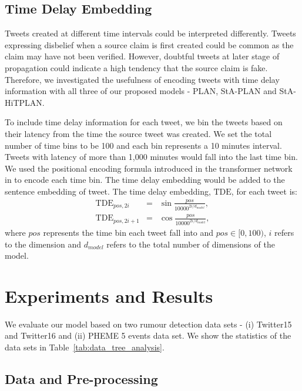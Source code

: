\documentclass[letterpaper]{article} %
\begin{document}
\subsection{Time Delay Embedding}
\label{sec:timedelay}
Tweets created at different time intervals could be interpreted differently. Tweets expressing disbelief when a source claim is first created could be common as the claim may have not been verified. However, doubtful tweets at later stage of propagation could indicate a high tendency that the source claim is fake. Therefore, we investigated the usefulness of encoding tweets with time delay information with all three of our proposed models - PLAN, StA-PLAN and StA-HiTPLAN.

To include time delay information for each tweet, we bin the tweets based on their latency from the time the source tweet was created. We set the total number of time bins to be 100 and each bin represents a 10 minutes interval. Tweets with latency of more than 1,000 minutes would fall into the last time bin.
We used the positional encoding formula introduced in the transformer network in \citet{DBLP:journals/corr/VaswaniSPUJGKP17} to encode each time bin. The time delay embedding would be added to the sentence embedding of tweet. The time delay embedding, $\mathrm{TDE}$, for each tweet is: 
\begin{eqnarray}
\mathrm{TDE}_{pos,2i} &=& \sin \frac{pos}{10000^{2i/d_{model}}}, \\ 
\mathrm{TDE}_{pos,2i+1} &=& \cos \frac{pos}{10000^{2i/d_{model}}},
\end{eqnarray}
where $pos$ represents the time bin each tweet fall into and $pos \in [0,100)$, $i$ refers to the dimension and $d_{model}$ refers to the total number of dimensions of the model. 
\newcommand{\tabitem}{~~\llap{\textbullet}~~}
\section{Experiments and Results}

We evaluate our model based on two rumour detection data sets - (i) Twitter15 and Twitter16 and (ii) PHEME 5 events data set. We show the statistics of the data sets in Table~\ref{tab:data_tree_analysis}. 

\subsection{Data and Pre-processing} \label{data_pre_processing}
\end{document}
